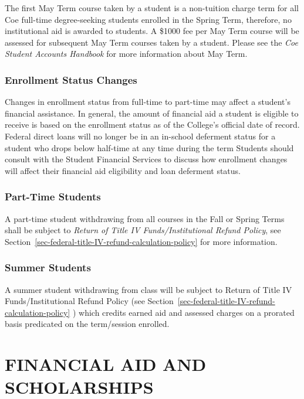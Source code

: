 \documentclass[
  letterpaper,
]{scrbook}
\begin{document}
The first May Term course taken by a student is a non-tuition charge
term for all Coe full-time degree-seeking students enrolled in the
Spring Term, therefore, no institutional aid is awarded to students. A
\$1000 fee per May Term course will be assessed for subsequent May Term
courses taken by a student. Please see the \emph{Coe Student Accounts
Handbook} for more information about May Term.

\subsection{Enrollment Status Changes}\label{enrollment-status-changes}

Changes in enrollment status from full-time to part-time may affect a
student's financial assistance. In general, the amount of financial aid
a student is eligible to receive is based on the enrollment status as of
the College's official date of record. Federal direct loans will no
longer be in an in-school deferment status for a student who drops below
half-time at any time during the term Students should consult with the
Student Financial Services to discuss how enrollment changes will affect
their financial aid eligibility and loan deferment status.

\subsection{Part-Time Students}\label{part-time-students}

A part-time student withdrawing from all courses in the Fall or Spring
Terms shall be subject to \emph{Return of Title IV Funds/Institutional
Refund Policy}, see
Section~\ref{sec-federal-title-IV-refund-calculation-policy} for more
information.

\subsection{Summer Students}\label{summer-students}

A summer student withdrawing from class will be subject to Return of
Title IV Funds/Institutional Refund Policy (see
Section~\ref{sec-federal-title-IV-refund-calculation-policy} ) which
credits earned aid and assessed charges on a prorated basis predicated
on the term/session enrolled.

\chapter{FINANCIAL AID AND
SCHOLARSHIPS}\label{financial-aid-and-scholarships}
\end{document}
